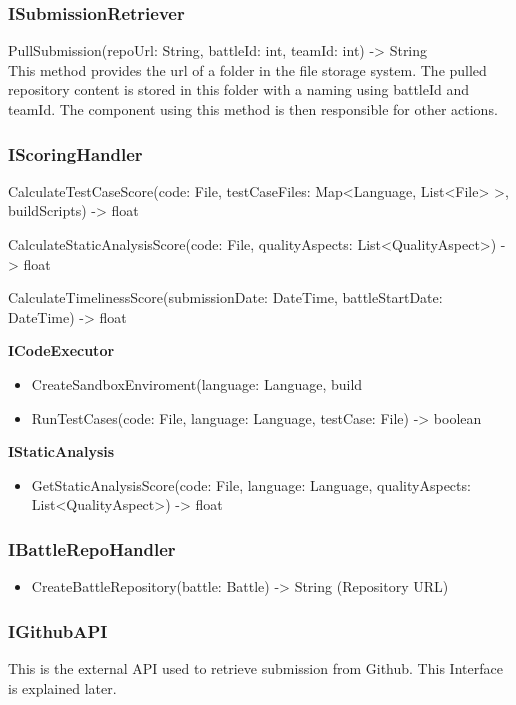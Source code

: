 \subsubsection{ISubmissionRetriever}
    \item PullSubmission(repoUrl: String, battleId: int, teamId: int) -> String \\
    This method provides the url of a folder in the file storage system. The pulled repository content is stored in this folder with a naming using battleId and teamId. The component using this method is then responsible for other actions. 
\subsubsection{IScoringHandler}
   \item CalculateTestCaseScore(code: File, testCaseFiles: Map<Language, List<File> >, buildScripts) -> float
   \item CalculateStaticAnalysisScore(code: File, qualityAspects: List<QualityAspect>) -> float
   \item CalculateTimelinessScore(submissionDate: DateTime, battleStartDate: DateTime) -> float
   \item \textbf{ICodeExecutor}
   \begin{itemize}
        \item CreateSandboxEnviroment(language: Language, build
       \item RunTestCases(code: File, language: Language, testCase: File) -> boolean
   \end{itemize}
   \item \textbf{IStaticAnalysis}
   \begin{itemize}
       \item GetStaticAnalysisScore(code: File, language: Language, qualityAspects: List<QualityAspect>) -> float
   \end{itemize}
\subsubsection{IBattleRepoHandler}
\begin{itemize}
    \item CreateBattleRepository(battle: Battle) -> String (Repository URL)
\end{itemize}
\subsubsection{IGithubAPI}
This is the external API used to retrieve submission from Github. This Interface is explained later.
